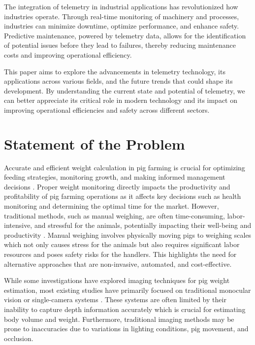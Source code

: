 {The integration of telemetry in industrial applications has revolutionized how industries operate. Through real-time monitoring of machinery and processes, industries can minimize downtime, optimize performance, and enhance safety. Predictive maintenance, powered by telemetry data, allows for the identification of potential issues before they lead to failures, thereby reducing maintenance costs and improving operational efficiency.

This paper aims to explore the advancements in telemetry technology, its applications across various fields, and the future trends that could shape its development. By understanding the current state and potential of telemetry, we can better appreciate its critical role in modern technology and its impact on improving operational efficiencies and safety across different sectors.


\section{Statement of the Problem}

Accurate and efficient weight calculation in pig farming is crucial for optimizing feeding strategies, monitoring growth, and making informed management decisions \citep{pezzuolo2018barn}. Proper weight monitoring directly impacts the productivity and profitability of pig farming operations as it affects key decisions such as health monitoring and determining the optimal time for the market. However, traditional methods, such as manual weighing, are often time-consuming, labor-intensive, and stressful for the animals, potentially impacting their well-being and productivity \citep{li2014estimation}. Manual weighing involves physically moving pigs to weighing scales which not only causes stress for the animals but also requires significant labor resources and poses safety risks for the handlers. This highlights the need for alternative approaches that are non-invasive, automated, and cost-effective.

While some investigations have explored imaging techniques for pig weight estimation, most existing studies have primarily focused on traditional monocular vision or single-camera systems \citep{pezzuolo2018barn}\citep{kollis2007weight}. These systems are often limited by their inability to capture depth information accurately which is crucial for estimating body volume and weight. Furthermore, traditional imaging methods may be prone to inaccuracies due to variations in lighting conditions, pig movement, and occlusion.

}
